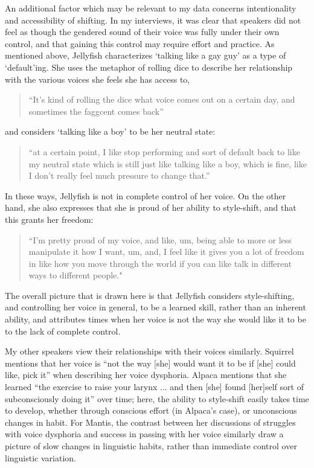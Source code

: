 \documentclass[12pt,twoside]{reedthesis}
\begin{document}
An additional factor which may be relevant to my data concerns intentionality and accessibility of shifting. In my interviews, it was clear that speakers did not feel as though the gendered sound of their voice was fully under their own control, and that gaining this control may require effort and practice. As mentioned above, Jellyfish characterizes `talking like a gay guy' as a type of `default'ing. She uses the metaphor of rolling dice to describe her relationship with the various voices she feels she has access to,
\begin{quote}
``It's kind of rolling the dice what voice comes out on a certain day, and sometimes the faggcent comes back''
\end{quote}
and considers `talking like a boy' to be her neutral state:
\begin{quote}
``at a certain point, I like stop performing and sort of default back to like my neutral state which is still just like talking like a boy, which is fine, like I don't really feel much pressure to change that.''
\end{quote}
In these ways, Jellyfish is not in complete control of her voice. On the other hand, she also expresses that she is proud of her ability to style-shift, and that this grants her freedom:
\begin{quote}
 ``I'm pretty proud of my voice, and like, um, being able to more or less manipulate it how I want, um, and, I feel like it gives you a lot of freedom in like how you move through the world if you can like talk in different ways to different people."
\end{quote}
The overall picture that is drawn here is that Jellyfish considers style-shifting, and controlling her voice in general, to be a learned skill, rather than an inherent ability, and attributes times when her voice is not the way she would like it to be to the lack of complete control.

My other speakers view their relationships with their voices similarly. Squirrel mentions that  her voice is ``not the way [she] would want it to be if [she] could like, pick it'' when describing her voice dysphoria. Alpaca mentions that she learned ``the exercise to raise your larynx ... and then [she] found [her]self sort of subconsciously doing it'' over time; here, the ability to style-shift easily takes time to develop, whether through conscious effort (in Alpaca's case), or unconscious changes in habit. For Mantis, the contrast between her discussions of struggles with voice dysphoria and success in passing with her voice similarly draw a picture of slow changes in linguistic habits, rather than immediate control over linguistic variation.
\end{document}
